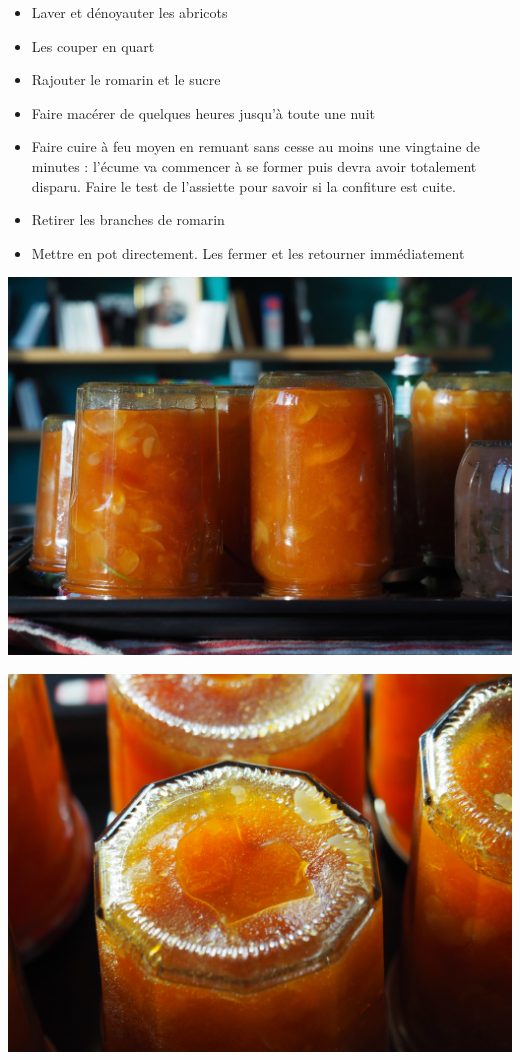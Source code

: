 \documentclass[]{book}
\providecommand{\tightlist}{%
  \setlength{\itemsep}{0pt}\setlength{\parskip}{0pt}}
\begin{document}
\begin{itemize}
\tightlist
\item
  Laver et dénoyauter les abricots
\item
  Les couper en quart
\item
  Rajouter le romarin et le sucre
\item
  Faire macérer de quelques heures jusqu'à toute une nuit
\item
  Faire cuire à feu moyen en remuant sans cesse au moins une vingtaine de minutes : l'écume va commencer à se former puis devra avoir totalement disparu. Faire le test de l'assiette pour savoir si la confiture est cuite.
\item
  Retirer les branches de romarin
\item
  Mettre en pot directement. Les fermer et les retourner immédiatement
\end{itemize}

\begin{center}\includegraphics[width=0.9\linewidth]{photos/conf1} \end{center}

\begin{center}\includegraphics[width=0.9\linewidth]{photos/conf2} \end{center}
\end{document}
